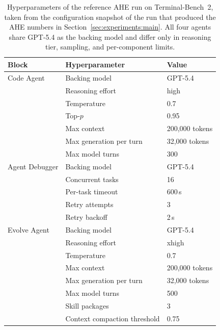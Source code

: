 \begin{table}[h]
    \centering
    \small
    \setlength{\tabcolsep}{6pt}
    \renewcommand{\arraystretch}{1.05}
    \caption{Hyperparameters of the reference AHE run on Terminal-Bench~2, taken from the configuration snapshot of the run that produced the AHE numbers in Section~\ref{sec:experiments:main}. All four agents share GPT-5.4 as the backing model and differ only in reasoning tier, sampling, and per-component limits.}
    \label{tab:hparams}
    \begin{tabular}{lll}
        \toprule
        Block & Hyperparameter & Value \\
        \midrule
        Code Agent
            & Backing model              & GPT-5.4 \\
            & Reasoning effort           & high \\
            & Temperature                & 0.7 \\
            & Top-$p$                    & 0.95 \\
            & Max context                & 200{,}000 tokens \\
            & Max generation per turn    & 32{,}000 tokens \\
            & Max model turns            & 300 \\
        \midrule
        Agent Debugger
            & Backing model              & GPT-5.4 \\
            & Concurrent tasks           & 16 \\
            & Per-task timeout           & 600\,s \\
            & Retry attempts             & 3 \\
            & Retry backoff              & 2\,s \\
        \midrule
        Evolve Agent
            & Backing model              & GPT-5.4 \\
            & Reasoning effort           & xhigh \\
            & Temperature                & 0.7 \\
            & Max context                & 200{,}000 tokens \\
            & Max generation per turn    & 32{,}000 tokens \\
            & Max model turns            & 500 \\
            & Skill packages             & 3 \\
            & Context compaction threshold & 0.75 \\

\end{tabular}
\end{table}
